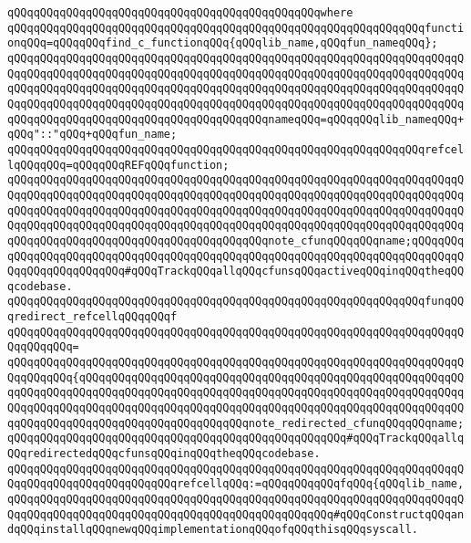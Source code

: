 \verb|qQQqqQQqqQQqqQQqqQQqqQQqqQQqqQQqqQQqqQQqqQQqqQQqwhere|\newline
\verb|qQQqqQQqqQQqqQQqqQQqqQQqqQQqqQQqqQQqqQQqqQQqqQQqqQQqqQQqqQQqqQQqfunctionqQQq=qQQqqQQqfind_c_functionqQQq{qQQqlib_name,qQQqfun_nameqQQq};|\newline
\verb|qQQqqQQqqQQqqQQqqQQqqQQqqQQqqQQqqQQqqQQqqQQqqQQqqQQqqQQqqQQqqQQqqQQqqQQqqQQqqQQqqQQqqQQqqQQqqQQqqQQqqQQqqQQqqQQqqQQqqQQqqQQqqQQqqQQqqQQqqQQqqQQqqQQqqQQqqQQqqQQqqQQqqQQqqQQqqQQqqQQqqQQqqQQqqQQqqQQqqQQqqQQqqQQqqQQqqQQqqQQqqQQqqQQqqQQqqQQqqQQqqQQqqQQqqQQqqQQqqQQqqQQqqQQqqQQqqQQqqQQqqQQqqQQqqQQqqQQqqQQqqQQqqQQqqQQqqQQqqQQqnameqQQq=qQQqqQQqlib_nameqQQq+qQQq"::"qQQq+qQQqfun_name;|\newline
\verb|qQQqqQQqqQQqqQQqqQQqqQQqqQQqqQQqqQQqqQQqqQQqqQQqqQQqqQQqqQQqqQQqrefcellqQQqqQQq=qQQqqQQqREFqQQqfunction;|\newline
\verb|qQQqqQQqqQQqqQQqqQQqqQQqqQQqqQQqqQQqqQQqqQQqqQQqqQQqqQQqqQQqqQQqqQQqqQQqqQQqqQQqqQQqqQQqqQQqqQQqqQQqqQQqqQQqqQQqqQQqqQQqqQQqqQQqqQQqqQQqqQQqqQQqqQQqqQQqqQQqqQQqqQQqqQQqqQQqqQQqqQQqqQQqqQQqqQQqqQQqqQQqqQQqqQQqqQQqqQQqqQQqqQQqqQQqqQQqqQQqqQQqqQQqqQQqqQQqqQQqqQQqqQQqqQQqqQQqqQQqqQQqqQQqqQQqqQQqqQQqqQQqqQQqqQQqqQQqqQQqqQQqnote_cfunqQQqqQQqname;qQQqqQQqqQQqqQQqqQQqqQQqqQQqqQQqqQQqqQQqqQQqqQQqqQQqqQQqqQQqqQQqqQQqqQQqqQQqqQQqqQQqqQQqqQQqqQQq#qQQqTrackqQQqallqQQqcfunsqQQqactiveqQQqinqQQqtheqQQqcodebase.|\newline
\verb|qQQqqQQqqQQqqQQqqQQqqQQqqQQqqQQqqQQqqQQqqQQqqQQqqQQqqQQqqQQqqQQqfunqQQqredirect_refcellqQQqqQQqf|\newline
\verb|qQQqqQQqqQQqqQQqqQQqqQQqqQQqqQQqqQQqqQQqqQQqqQQqqQQqqQQqqQQqqQQqqQQqqQQqqQQqqQQq=|\newline
\verb|qQQqqQQqqQQqqQQqqQQqqQQqqQQqqQQqqQQqqQQqqQQqqQQqqQQqqQQqqQQqqQQqqQQqqQQqqQQqqQQq{qQQqqQQqqQQqqQQqqQQqqQQqqQQqqQQqqQQqqQQqqQQqqQQqqQQqqQQqqQQqqQQqqQQqqQQqqQQqqQQqqQQqqQQqqQQqqQQqqQQqqQQqqQQqqQQqqQQqqQQqqQQqqQQqqQQqqQQqqQQqqQQqqQQqqQQqqQQqqQQqqQQqqQQqqQQqqQQqqQQqqQQqqQQqqQQqqQQqqQQqqQQqqQQqqQQqqQQqqQQqqQQqqQQqqQQqqQQqnote_redirected_cfunqQQqqQQqname;qQQqqQQqqQQqqQQqqQQqqQQqqQQqqQQqqQQqqQQqqQQqqQQqqQQq#qQQqTrackqQQqallqQQqredirectedqQQqcfunsqQQqinqQQqtheqQQqcodebase.|\newline
\newline
\verb|qQQqqQQqqQQqqQQqqQQqqQQqqQQqqQQqqQQqqQQqqQQqqQQqqQQqqQQqqQQqqQQqqQQqqQQqqQQqqQQqqQQqqQQqqQQqqQQqrefcellqQQq:=qQQqqQQqqQQqfqQQq{qQQqlib_name,qQQqqQQqqQQqqQQqqQQqqQQqqQQqqQQqqQQqqQQqqQQqqQQqqQQqqQQqqQQqqQQqqQQqqQQqqQQqqQQqqQQqqQQqqQQqqQQqqQQqqQQqqQQqqQQqqQQqqQQq#qQQqConstructqQQqandqQQqinstallqQQqnewqQQqimplementationqQQqofqQQqthisqQQqsyscall.|\newline
